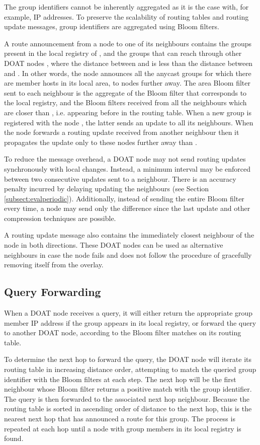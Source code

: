 The group identifiers cannot be inherently aggregated as it is the case
with, for example, IP addresses. To preserve the scalability of routing
tables and routing update messages, group identifiers are aggregated using
Bloom filters. 

A route announcement from a node  to one of its neighbours  contains
the groups present in the local registry of , and the groups that 
can reach through other DOAT nodes , where the distance between 
 and  is less than the distance between  and . In other words, the node
announces all the anycast groups for which there are member hosts in its
local area, to nodes further away.  The area Bloom filter sent to
each neighbour  is the aggregate of the Bloom filter that corresponds to the local registry, and the Bloom
filters received from all the neighbours which are closer than ,
i.e. appearing before  in the routing table. 
When a new group is registered with the node , the latter sends an update to all its neighbours.
When the node  forwards a routing update received from another neighbour 
then it propagates the update only to these nodes further away than .

To reduce the message overhead, a DOAT node may not send routing updates
synchronously with local changes. Instead, a minimum interval may be enforced
between two consecutive updates sent to a neighbour. There is an
accuracy penalty incurred by delaying updating the neighbours
(see Section \ref{subsect:evalperiodic}).
Additionally, instead of sending the entire
Bloom filter every time, a node may send only the difference since the last
update and other compression techniques are possible.


A routing update message also contains the
immediately closest neighbour of the node in both directions. 
These DOAT nodes can be used as alternative neighbours in case the
node fails and does not follow the procedure of gracefully removing itself
from the overlay.

\subsection{Query Forwarding}
\label{subsect:querying}

When a DOAT node receives a query, it will either return the appropriate
group member IP address if the group appears in its local registry, or
forward the query to another DOAT node, according to the Bloom filter
matches on its routing table.

To determine the next hop to forward the query, the DOAT node
will iterate its routing table in increasing distance order, attempting to
match the queried group identifier with the Bloom filters at each step.
The next hop will be the first neighbour whose Bloom filter returns a positive
match with the group identifier. The query is then forwarded to the
associated next hop neighbour. Because the routing table is sorted in ascending order
of distance to the next hop, this is the nearest next hop that has
announced a route for this group. The process is repeated at
each hop until a node with group members in its 
local registry is found.

